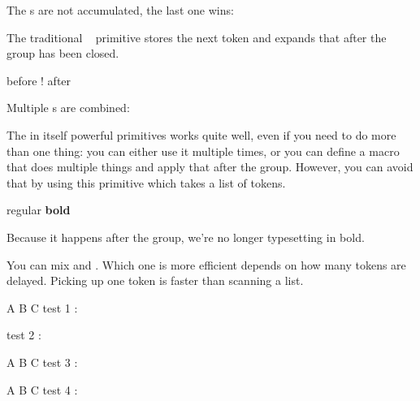 \typebuffer

The s are not accumulated, the last one wins:

{\getbuffer}

\stopoldprimitive

\startoldprimitive[title={\prm {aftergroup}}]

The traditional \TEX\  primitive stores the next token and
expands that after the group has been closed.

\startbuffer
before{ ! \aftergroup a\aftergroup f\aftergroup t\aftergroup e\aftergroup r}
\stopbuffer

Multiple s are combined:

\typebuffer

\getbuffer

\stopoldprimitive

\startnewprimitive[title={\prm {aftergrouped}}]

The in itself powerful  primitives works quite well, even
if you need to do more than one thing: you can either use it multiple times, or
you can define a macro that does multiple things and apply that after the group.
However, you can avoid that by using this primitive which takes a list of tokens.

\startbuffer
regular
\bgroup
{}%
\bf bold
\egroup
\stopbuffer

\typebuffer

Because it happens after the group, we're no longer typesetting in bold.

{\getbuffer}

You can mix  and . Which one is more
efficient depends on how many tokens are delayed. Picking up one token is faster
than scanning a list.

\startbuffer
{
    \aftergroup A \aftergroup B \aftergroup C
test 1 : }

{
test 2 : }


{
    \aftergroup A 
    \aftergroup B 
    \aftergroup C 
test 3 : }

{
     \aftergroup A
     \aftergroup B
     \aftergroup C
test 4 : }
\stopbuffer

